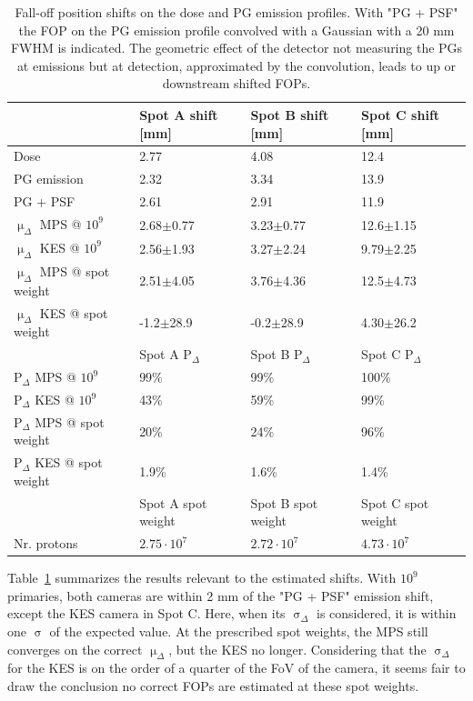 \documentclass[a4paper,english]{article}
\begin{document}
\begin{table}
\centering
\begin{tabular}{llll}
	 & Spot A shift [mm] & Spot B shift [mm] & Spot C shift [mm]\\
	\midrule
	Dose & 2.77 & 4.08 & 12.4\\
	PG emission & 2.32 & 3.34 & 13.9\\
	PG + PSF & 2.61 & 2.91 & 11.9\\
	$\upmu_\Delta$ MPS @ $10^9$      & 2.68$\pm$0.77 & 3.23$\pm$0.77 & 12.6$\pm$1.15 \\
	$\upmu_\Delta$ KES @ $10^9$      & 2.56$\pm$1.93 & 3.27$\pm$2.24 & 9.79$\pm$2.25 \\
	$\upmu_\Delta$ MPS @ spot weight & 2.51$\pm$4.05 & 3.76$\pm$4.36 & 12.5$\pm$4.73 \\
	$\upmu_\Delta$ KES @ spot weight & -1.2$\pm$28.9 & -0.2$\pm$28.9 & 4.30$\pm$26.2 \\
	\midrule
	 & Spot A P$_\Delta$ & Spot B P$_\Delta$ & Spot C P$_\Delta$\\
	\midrule
	P$_\Delta$ MPS @ $10^9$      & 99\%  & 99\% & 100\% \\
	P$_\Delta$ KES @ $10^9$      & 43\%  & 59\% & 99\% \\
	P$_\Delta$ MPS @ spot weight & 20\%  & 24\% & 96\% \\
	P$_\Delta$ KES @ spot weight & 1.9\% & 1.6\% & 1.4\% \\
	\midrule
	 & Spot A spot weight & Spot B spot weight & Spot C spot weight\\
	\midrule
	Nr. protons & $2.75\cdot10^7$ & $2.72\cdot10^7$ & $4.73\cdot10^7$ \\
\end{tabular}
\caption{Fall-off position shifts on the dose and PG emission profiles. With "PG + PSF" the FOP on the PG emission profile convolved with a Gaussian with a 20 mm FWHM is indicated. The geometric effect of the detector not measuring the PGs at emissions but at detection, approximated by the convolution, leads to up or downstream shifted FOPs.}
\label{table:spots}
\end{table}

Table~\ref{table:spots} summarizes the results relevant to the estimated shifts. With $10^9$ primaries, both cameras are within 2 mm of the "PG + PSF" emission shift, except the KES camera in Spot C. Here, when its $\upsigma_\Delta$ is considered, it is within one $\upsigma$ of the expected value. At the prescribed spot weights, the MPS still converges on the correct $\upmu_\Delta$, but the KES no longer. Considering that the $\upsigma_\Delta$ for the KES is on the order of a quarter of the FoV of the camera, it seems fair to draw the conclusion no correct FOPs are estimated at these spot weights.
\end{document}
